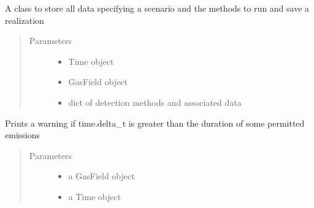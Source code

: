 \documentclass[letterpaper,10pt,english]{sphinxmanual}
\begin{document}
\begin{fulllineitems}
\label{\detokenize{index:feast.EmissionSimModules.simulation_classes.Scenario}}
A class to store all data specifying a scenario and the methods to run and save a realization
\begin{quote}\begin{description}
\item[{Parameters}] \leavevmode\begin{itemize}
\item {} 
 \textendash{} Time object

\item {} 
 \textendash{} GasField object

\item {} 
 \textendash{} dict of detection methods and associated data

\end{itemize}

\end{description}\end{quote}

\begin{fulllineitems}
\label{\detokenize{index:feast.EmissionSimModules.simulation_classes.Scenario.check_timestep}}
Prints a warning if time.delta\_t is greater than the duration of some permitted emissions
\begin{quote}\begin{description}
\item[{Parameters}] \leavevmode\begin{itemize}
\item {} 
 \textendash{} a GasField object

\item {} 
 \textendash{} a Time object

\end{itemize}


\end{description}
\end{quote}
\end{fulllineitems}
\end{fulllineitems}
\end{document}
